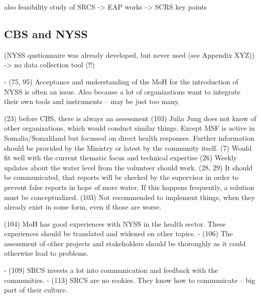 also feasibility study of SRCS -> EAP works -> SCRS key points


\subsection{CBS and NYSS} (NYSS qustionnaire was already developed, but never used (see Appendix XYZ))
-> no data collection tool (!!) 














-	(75, 95) Acceptance and understanding of the MoH for the introduction of NYSS is often an issue. Also because a lot of organizations want to integrate their own tools and instruments – may be just too many.

(23) before CBS, there is always an assessment
(103) Julia Jung does not know of other organizations, which would conduct similar things. Except MSF is active in Somalia/Somaliland but focussed on direct health responses. Further information should be provided by the Ministry or latest by the community itself.
(7) Would fit well with the current thematic focus and technical expertise
(26) Weekly updates about the water level from the volunteer should work.
(28, 29) It should be communicated, that reports will be checked by the supervisor in order to prevent false reports in hope of more water. If this happens frequently, a solution must be conceptualized.
(103) Not recommended to implement things, when they already exist in some form, even if those are worse. 

(104) MoH has good experiences with NYSS in the health sector. These experiences should be translated and widened on other topics.
-	(106) The assessment of other projects and stakeholders should be thoroughly as it could otherwise lead to problems.

-	(109) SRCS invests a lot into communication and feedback with the communities.
-	(113) SRCS are no rookies. They know how to communicate – big part of their culture.


